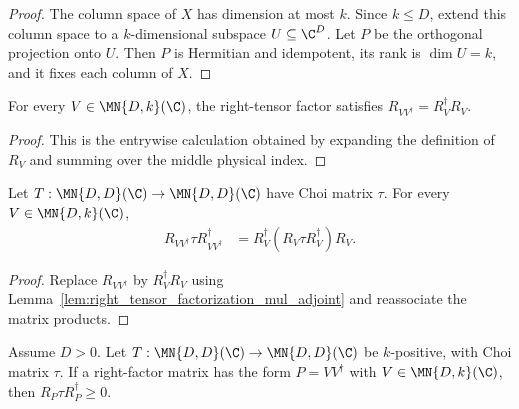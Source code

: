 \begin{proof}
    \leanok
    The column space of $X$ has dimension at most $k$. Since $k\le D$, extend
    this column space to a $k$-dimensional subspace $U\subseteq\C^D$. Let $P$
    be the orthogonal projection onto $U$. Then $P$ is Hermitian and
    idempotent, its rank is $\dim U=k$, and it fixes each column of $X$.
\end{proof}

\begin{lemma}
    \label{lem:right_tensor_factorization_mul_adjoint}
    \leanok
    For every $V\in\MN{D,k}(\C)$, the right-tensor factor satisfies
    $R_{VV^\dagger}=R_V^\dagger R_V$.
\end{lemma}

\begin{proof}
    \leanok
    This is the entrywise calculation obtained by expanding the definition of
    $R_V$ and summing over the middle physical index.
\end{proof}

\begin{lemma}
    \label{lem:factorized_right_tensor_choi_sandwich}
    \leanok
    Let $T:\MN{D,D}(\C)\to\MN{D,D}(\C)$ have Choi matrix $\tau$. For every
    $V\in\MN{D,k}(\C)$,
    \begin{align}
        R_{VV^\dagger}\tau R_{VV^\dagger}^\dagger
         & =R_V^\dagger(R_V\tau R_V^\dagger)R_V.
        \label{eq:schwarz_factorized_choi_sandwich}
    \end{align}
\end{lemma}

\begin{proof}
    \leanok
    Replace $R_{VV^\dagger}$ by $R_V^\dagger R_V$ using
    Lemma~\ref{lem:right_tensor_factorization_mul_adjoint} and reassociate the
    matrix products.
\end{proof}

\begin{theorem}
    \label{thm:factorized_right_projection_choi_sandwich}
    \leanok
    Assume $D>0$. Let $T:\MN{D,D}(\C)\to\MN{D,D}(\C)$ be $k$-positive,
    with Choi matrix $\tau$. If a right-factor matrix has the form
    $P=VV^\dagger$ with $V\in\MN{D,k}(\C)$, then
    $R_P\tau R_P^\dagger\geq0$.
\end{theorem}

